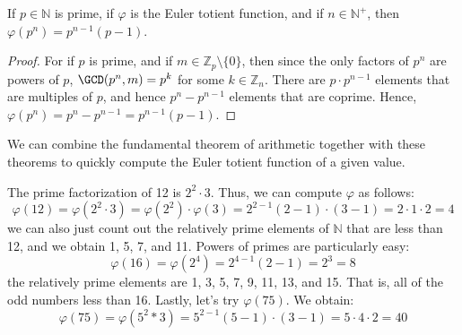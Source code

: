 \documentclass{article}                                                        %
\begin{document}
            \begin{theorem}
                \label{thm:Euler_Totient_Powers_of_Primes}%
                If $p\in\mathbb{N}$ is prime, if $\varphi$ is the Euler totient
                function, and if $n\in\mathbb{N}^{+}$, then
                $\varphi(p^{n})=p^{n-1}(p-1)$.
            \end{theorem}
            \begin{proof}
                For if $p$ is prime, and if $m\in\mathbb{Z}_{p}\setminus\{0\}$,
                then since the only factors of $p^{n}$ are powers of $p$,
                $\GCD(p^{n},m)=p^{k}$ for some $k\in\mathbb{Z}_{n}$. There are
                $p\cdot{p}^{n-1}$ elements that are multiples of $p$, and hence
                $p^{n}-p^{n-1}$ elements that are coprime. Hence,
                $\varphi(p^{n})=p^{n}-p^{n-1}=p^{n-1}(p-1)$.
            \end{proof}
            We can combine the fundamental theorem of arithmetic together with
            these theorems to quickly compute the Euler totient function of a
            given value.
            \begin{example}
                The prime factorization of 12 is $2^{2}\cdot{3}$. Thus, we can
                compute $\varphi$ as follows:
                \begin{equation}
                    \varphi(12)=\varphi(2^{2}\cdot{3})
                        =\varphi(2^{2})\cdot\varphi(3)
                        =2^{2-1}(2-1)\cdot(3-1)=2\cdot{1}\cdot{2}=4
                \end{equation}
                we can also just count out the relatively prime elements of
                $\mathbb{N}$ that are less than 12, and we obtain 1, 5, 7, and
                11. Powers of primes are particularly easy:
                \begin{equation}
                    \varphi(16)=\varphi(2^{4})=2^{4-1}(2-1)=2^{3}=8
                \end{equation}
                the relatively prime elements are 1, 3, 5, 7, 9, 11, 13, and 15.
                That is, all of the odd numbers less than 16. Lastly, let's try
                $\varphi(75)$. We obtain:
                \begin{equation}
                    \varphi(75)=\varphi(5^{2}*3)=5^{2-1}(5-1)\cdot(3-1)
                        =5\cdot{4}\cdot{2}=40
                \end{equation}
            \end{example}
\end{document}
